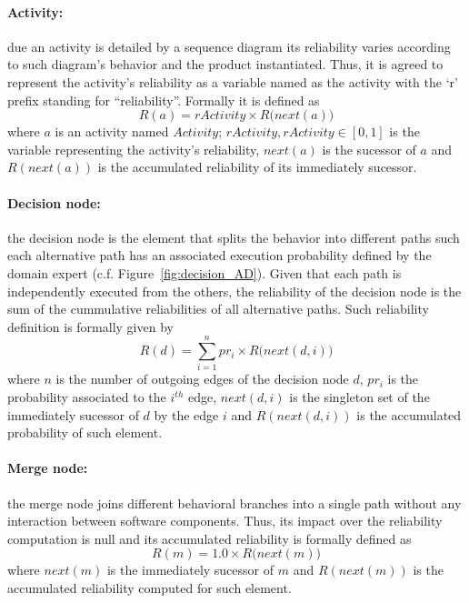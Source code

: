 \paragraph{Activity:}
due an activity is detailed by a sequence diagram its reliability varies 
according to such diagram's behavior and the product instantiated.  Thus, it is
agreed to represent the activity's reliability as a variable named as the
activity with the `r' prefix standing for ``reliability''. Formally it is
defined as \begin{equation}\label{eq:activityReliability}R(a) = rActivity \times
	R\big(next(a)\big)\end{equation} where $a$ is an activity named $Activity$;
$rActivity, rActivity \in [0,1]$ is the variable representing the activity's
reliability, $next(a)$ is the sucessor of $a$ and $R(next(a))$ is the accumulated reliability of its immediately
sucessor.


\paragraph{Decision node:}
the decision node is the element that  splits the behavior into different paths
such each alternative path has an associated execution probability
defined by the domain expert (c.f. Figure~\ref{fig:decision_AD}). Given that each path is independently executed 
from the others, the reliability of the decision node is the sum of the
cummulative reliabilities of all alternative paths. Such reliability
definition is formally given by \begin{equation}
	\label{eq:decisionNodeReliability} R(d) = \sum_{i=1}^{n} pr_{i} \times
	R\big(next(d, i)\big) \end{equation} where $n$ is the number of outgoing edges
of the decision node $d$, $pr_i$ is the
probability associated to the $i^{th}$ edge, $next(d, i)$ is the singleton set
of the immediately sucessor of $d$ by the edge $i$ and $R(next(d,i))$ is the
accumulated probability of such element.


\paragraph{Merge node:}
the merge node joins different behavioral branches into a single path without
any interaction between software components. Thus, its impact over the
reliability computation is null and its accumulated reliability is formally
defined as \begin{equation} \label{eq:mergeNodeReliability} R(m) = 1.0 \times
	R\big(next(m)\big) \end{equation} where $next(m)$ is the immediately sucessor of $m$ and $R(next(m))$ is the accumulated
reliability computed for such element.


